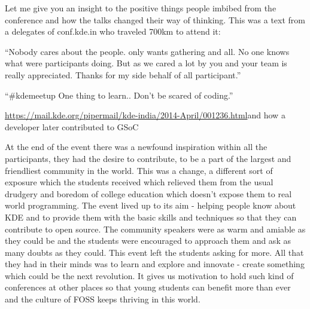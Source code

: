Let me give you an insight to the positive things people imbibed from the conference and how the talks changed their way of thinking. This was a text from a delegates of conf.kde.in  who traveled 700km to attend it:

``Nobody cares about the people. only wants gathering and all. No one knows what were participants doing. But as we cared a lot by you and your team is really appreciated. Thanks for my side behalf of all participant.''

``\#kdemeetup One thing to learn.. Don’t be scared of coding.''
 
\url{https://mail.kde.org/pipermail/kde-india/2014-April/001236.html}{and how a developer later contributed to GSoC}

At the end of the event there was a newfound inspiration within all the participants, they had the desire to contribute, to be a part of the largest and friendliest community in the world. This was a change, a different sort of exposure which the students received which relieved them from the usual drudgery and boredom of college education which doesn’t expose them to real world programming. The event lived up to its aim - helping people know about KDE and to provide them with the basic skills and techniques so that they can contribute to open source. The community speakers were as warm and amiable as they could be and the students were encouraged to approach them and ask as many doubts as they could. This event left the students asking for more. All that they had in their minds was to learn and explore and innovate - create something which could be the next revolution. It gives us motivation to hold such kind of conferences at other places so that young students can benefit more than ever and the culture of FOSS keeps thriving in this world.
